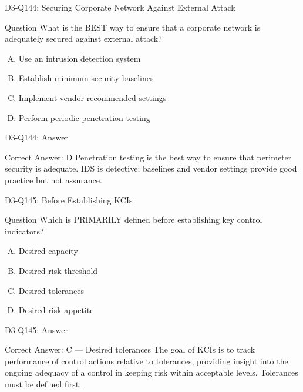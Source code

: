 \documentclass{beamer}
\begin{document}
	\begin{frame}{D3-Q144: Securing Corporate Network Against External Attack}
		\begin{block}{Question}
			What is the BEST way to ensure that a corporate network is adequately secured against external attack?
		\end{block}
		\begin{enumerate}[(A)]
			\item Use an intrusion detection system
			\item Establish minimum security baselines
			\item Implement vendor recommended settings
			\item Perform periodic penetration testing
		\end{enumerate}
	\end{frame}
	\begin{frame}{D3-Q144: Answer}
		\begin{block}{Correct Answer: D}
			Penetration testing is the best way to ensure that perimeter security is adequate. IDS is detective; baselines and vendor settings provide good practice but not assurance.
		\end{block}
	\end{frame}
	
	\begin{frame}{D3-Q145: Before Establishing KCIs}
		\begin{block}{Question}
			Which is PRIMARILY defined before establishing key control indicators?
		\end{block}
		\begin{enumerate}[(A)]
			\item Desired capacity
			\item Desired risk threshold
			\item Desired tolerances
			\item Desired risk appetite
		\end{enumerate}
	\end{frame}
	\begin{frame}{D3-Q145: Answer}
		\begin{block}{Correct Answer: C --- Desired tolerances}
			The goal of KCIs is to track performance of control actions relative to tolerances, providing insight into the ongoing adequacy of a control in keeping risk within acceptable levels. Tolerances must be defined first.
		\end{block}
	\end{frame}
	
\end{document}
